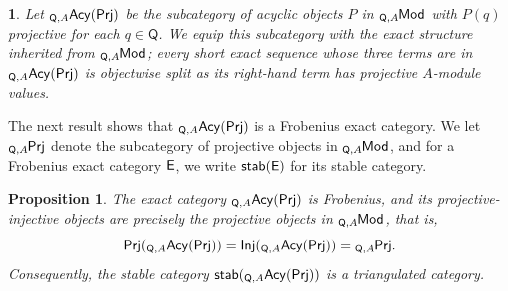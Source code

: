\documentclass{amsart}
\theoremstyle{bfupright head,slanted body}
\theoremstyle{bfupright head,upright body}
\theoremstyle{fixed bf head,slanted body}
\newtheorem{prp}[res]{Proposition}      \newtheorem*{prp*}{Proposition}
\theoremstyle{fixed bf head,upright body}
\theoremstyle{numbered paragraph}
\newtheorem{ipg}[res]{}
\numberwithin{equation}{res}
\newcommand{\AcQ}{{}_{\Q,A}\mathsf{Acy}(\sf Prj)}
\newcommand{\Prj}[1]{\mathsf{Prj}(#1)}
\newcommand{\Inj}[1]{\mathsf{Inj}(#1)}
\newcommand{\Q}{\mathsf{Q}}
\newcommand{\lMod}[1]{{}_{#1}\mspace{-1mu}{\sf{Mod}}}
\newcommand{\lPrj}[1]{{}_{#1}\mspace{-1mu}{\sf{Prj}}}
\begin{document}
\begin{ipg}
Let $\AcQ$ be the subcategory of acyclic objects $P$ in $\lMod{\Q,A}$ with $P(q)$ projective for each $q\in\Q$. We equip this subcategory with the exact structure inherited from $\lMod{\Q,A}$; every short exact sequence whose three terms are in $\AcQ$ is objectwise split as its right-hand term has projective $A$-module values.
\end{ipg}

The next result shows that $\AcQ$ is a Frobenius exact category. We let $\lPrj{\Q,A}$ denote the subcategory of projective objects in $\lMod{\Q,A}$, and for a Frobenius exact category $\sf E$, we write $\mathsf{stab}(\sf E)$ for
its stable category.

\begin{prp}\label{thm:EPrj-Frobenius}
The exact category $\AcQ$ is Frobenius, and its projective-injective objects are precisely the projective objects in
$\lMod{\Q,A}$, that is,
$${\Prj{\AcQ}}={\Inj{\AcQ}}=\lPrj{\Q,A}.$$
Consequently, the stable category $\mathsf{stab}(\AcQ)$ is a triangulated category.
\end{prp}
\end{document}
